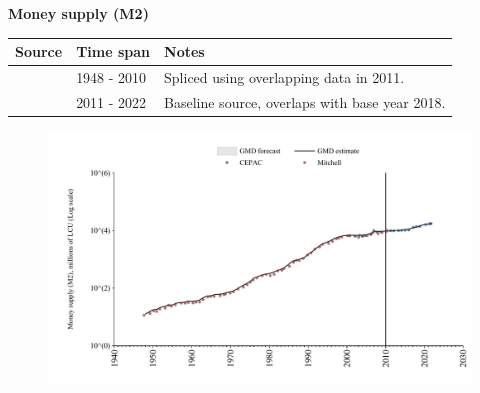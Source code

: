 \documentclass[12pt,a4paper,landscape]{article}
\begin{document}
\begin{adjustbox}{max totalsize={\paperwidth}{\paperheight},center}
\begin{minipage}[t][\textheight][t]{\textwidth}
\vspace*{0.5cm}
{}
\begin{center}
{\Large\bfseries Money supply (M2)}
\end{center}
\vspace{0.5cm}
\begin{table}[H]
\centering
\small
\begin{tabular}{|l|l|l|}
\hline
\textbf{Source} & \textbf{Time span} & \textbf{Notes} \\
\hline
\rowcolor{white}\cite{Mitchell}& 1948 - 2010 &Spliced using overlapping data in 2011. \\
\rowcolor{lightgray}\cite{CEPAC}& 2011 - 2022 &Baseline source, overlaps with base year 2018. \\
\hline
\end{tabular}
\end{table}
\begin{figure}[H]
\centering
\includegraphics[width=\textwidth,height=0.6\textheight,keepaspectratio]{graphs/SLV_M2.pdf}
\end{figure}
\end{minipage}
\end{adjustbox}
\end{document}
